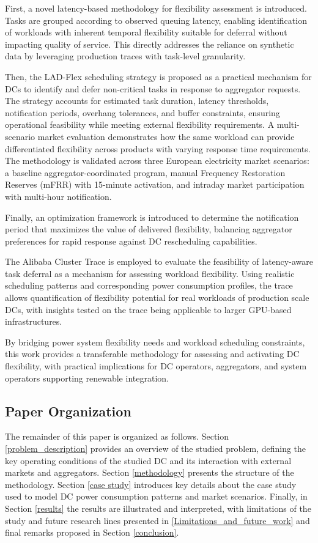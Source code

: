 \documentclass[preprint,12pt]{elsarticle}
\begin{document}
First, a novel latency-based methodology for flexibility assessment is introduced. Tasks are grouped according to observed queuing latency, enabling identification of workloads with inherent temporal flexibility suitable for deferral without impacting quality of service. This directly addresses the reliance on synthetic data by leveraging production traces with task-level granularity.

Then, the LAD-Flex scheduling strategy is proposed as a practical mechanism for DCs to identify and defer non-critical tasks in response to aggregator requests. The strategy accounts for estimated task duration, latency thresholds, notification periods, overhang tolerances, and buffer constraints, ensuring operational feasibility while meeting external flexibility requirements. A multi-scenario market evaluation demonstrates how the same workload can provide differentiated flexibility across products with varying response time requirements. The methodology is validated across three European electricity market scenarios: a baseline aggregator-coordinated program, manual Frequency Restoration Reserves (mFRR) with 15-minute activation, and intraday market participation with multi-hour notification.

Finally, an optimization framework is introduced to determine the notification period that maximizes the value of delivered flexibility, balancing aggregator preferences for rapid response against DC rescheduling capabilities.

The Alibaba Cluster Trace is employed to evaluate the feasibility of latency-aware task deferral as a mechanism for assessing workload flexibility. Using realistic scheduling patterns and corresponding power consumption profiles, the trace allows quantification of flexibility potential for real workloads of production scale DCs, with insights tested on the trace being applicable to larger GPU-based infrastructures.

By bridging power system flexibility needs and workload scheduling constraints, this work provides a transferable methodology for assessing and activating DC flexibility, with practical implications for DC operators, aggregators, and system operators supporting renewable integration.

\subsection{Paper Organization}
The remainder of this paper is organized as follows. Section \ref{problem_description} provides an overview of the studied problem, defining the key operating conditions of the studied DC and its interaction with external markets and aggregators. Section \ref{methodology} presents the structure of the methodology. Section \ref{case study} introduces key details about the case study used to model DC power consumption patterns and market scenarios. Finally, in Section \ref{results} the results are illustrated and interpreted, with limitations of the study and future research lines presented in \ref{Limitations_and_future_work} and final remarks proposed in Section \ref{conclusion}.
\end{document}
